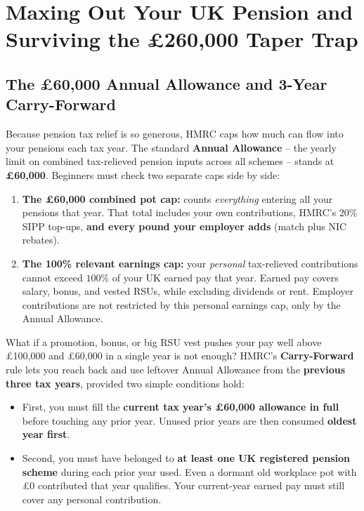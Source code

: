\section{Maxing Out Your UK Pension and Surviving the \pounds 260,000 Taper Trap}

\subsection{The \pounds 60,000 Annual Allowance and 3-Year Carry-Forward}

Because pension tax relief is so generous, HMRC caps how much can flow into your pensions each tax year. The standard \textbf{Annual Allowance} -- the yearly limit on combined tax-relieved pension inputs across all schemes -- stands at \textbf{\pounds 60,000}. Beginners must check two separate caps side by side:
\begin{enumerate}
  \item \textbf{The \pounds 60,000 combined pot cap:} counts \emph{everything} entering all your pensions that year. That total includes your own contributions, HMRC's $20\%$ SIPP top-ups, \textbf{and every pound your employer adds} (match plus NIC rebates).
  \item \textbf{The 100\% relevant earnings cap:} your \emph{personal} tax-relieved contributions cannot exceed $100\%$ of your UK earned pay that year. Earned pay covers salary, bonus, and vested RSUs, while excluding dividends or rent. Employer contributions are not restricted by this personal earnings cap, only by the Annual Allowance.
\end{enumerate}

What if a promotion, bonus, or big RSU vest pushes your pay well above \pounds 100,000 and \pounds 60,000 in a single year is not enough? HMRC's \textbf{Carry-Forward} rule lets you reach back and use leftover Annual Allowance from the \textbf{previous three tax years}, provided two simple conditions hold:
\begin{itemize}
  \item First, you must fill the \textbf{current tax year's \pounds 60,000 allowance in full} before touching any prior year. Unused prior years are then consumed \textbf{oldest year first}.
  \item Second, you must have belonged to \textbf{at least one UK registered pension scheme} during each prior year used. Even a dormant old workplace pot with \pounds 0 contributed that year qualifies. Your current-year earned pay must still cover any personal contribution.
\end{itemize}

